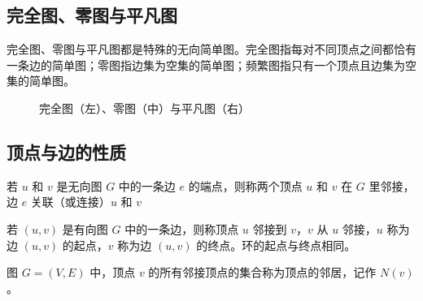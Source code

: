 \subsection{完全图、零图与平凡图}
完全图、零图与平凡图都是特殊的无向简单图。完全图指每对不同顶点之间都恰有一条边的简单图；零图指边集为空集的简单图；频繁图指只有一个顶点且边集为空集的简单图。
\begin{figure}[H]
    \centering
    \hspace{3em}
    \hspace{3em}
    \caption{完全图（左）、零图（中）与平凡图（右）}
    \label{完全图、零图与平凡图}
\end{figure}

\subsection{顶点与边的性质}
\begin{definition}[无向图顶点的邻接]\label{def:无向图邻接}
    若 $u$ 和 $v$ 是无向图 $G$ 中的一条边 $e$ 的端点，则称两个顶点 $u$ 和 $v$ 在 $G$ 里邻接，边 $e$ 关联（或连接）$u$ 和 $v$
\end{definition}
\begin{definition}[有向图顶点的邻接]\label{def:有向图邻接}
    若 $(u,v)$ 是有向图 $G$ 中的一条边，则称顶点 $u$ 邻接到 $v$，$v$ 从 $u$ 邻接，$u$ 称为边 $(u,v)$ 的起点，$v$ 称为边 $(u,v)$ 的终点。环的起点与终点相同。
\end{definition}
\begin{definition}[顶点的邻居]\label{def:邻居}
    图 $G=(V, E)$ 中，顶点 $v$ 的所有邻接顶点的集合称为顶点的邻居，记作 $N(v)$。
\end{definition}

